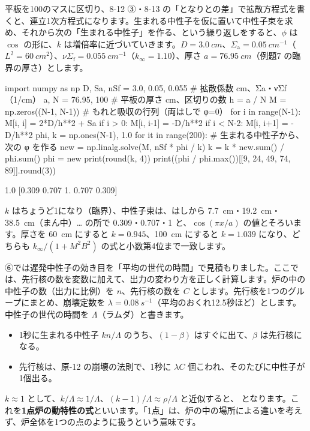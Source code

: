平板を100のマスに区切り、8-12 ③・8-13 の「となりとの差」で拡散方程式を書くと、連立1次方程式になります。生まれる中性子を仮に置いて中性子束を求め、それから次の「生まれる中性子」を作る、という繰り返しをすると、$\phi$ は $\cos$ の形に、$k$ は増倍率に近づいていきます。$D=\qty{3.0}{cm}$、$\Sigma_{\mathrm a}=\qty{0.05}{cm^{-1}}$（$L^2=\qty{60}{cm^2}$）、$\nu\Sigma_{\mathrm f}=\qty{0.055}{cm^{-1}}$（$k_\infty=1.10$）、厚さ $a=\qty{76.95}{cm}$（例題7 の臨界の厚さ）とします。
\begin{phcode}[Python]
import numpy as np
D, Sa, nSf = 3.0, 0.05, 0.055    \# 拡散係数 cm、Σa・νΣf（1/cm）
a, N = 76.95, 100                \# 平板の厚さ cm、区切りの数
h = a / N
M = np.zeros((N-1, N-1))         \# もれと吸収の行列（両はしで φ=0）
for i in range(N-1):
    M[i, i] = 2*D/h**2 + Sa
    if i > 0:   M[i, i-1] = -D/h**2
    if i < N-2: M[i, i+1] = -D/h**2
phi, k = np.ones(N-1), 1.0
for it in range(200):            \# 生まれる中性子から、次の φ を作る
    new = np.linalg.solve(M, nSf * phi / k)
    k = k * new.sum() / phi.sum()
    phi = new
print(round(k, 4))
print((phi / phi.max())[[9, 24, 49, 74, 89]].round(3))
\end{phcode}
\begin{phcodeout}[実行結果]
1.0
[0.309 0.707 1.    0.707 0.309]
\end{phcodeout}
$k$ はちょうど1になり（臨界）、中性子束は、はしから \qty{7.7}{cm}・\qty{19.2}{cm}・\qty{38.5}{cm}（まん中）… の所で 0.309・0.707・1 と、$\cos(\pi x/a)$ の値とそろいます。厚さを \qty{60}{cm} にすると $k=0.945$、\qty{100}{cm} にすると $k=1.039$ になり、どちらも $k_\infty/(1+M^2B^2)$ の式と小数第4位まで一致します。

\label{ph:原-15:sec8}
⑥では遅発中性子の効き目を「平均の世代の時間」で見積もりました。ここでは、先行核の数を変数に加えて、出力の変わり方を正しく計算します。炉の中の中性子の数（出力に比例）を $n$、先行核の数を $C$ とします。先行核を1つのグループにまとめ、崩壊定数を $\lambda=\qty{0.08}{s^{-1}}$（平均のおくれ12.5秒ほど）とします。中性子の世代の時間を $\Lambda$（ラムダ）と書きます。

\begin{itemize}[leftmargin=1.6\zw, itemsep=1pt, topsep=2pt]
\item 1秒に生まれる中性子 $kn/\Lambda$ のうち、$(1-\beta)$ はすぐに出て、$\beta$ は先行核になる。
\item 先行核は、原-12 の崩壊の法則で、1秒に $\lambda C$ 個こわれ、そのたびに中性子が1個出る。
\end{itemize}
$k\approx1$ として、$k/\Lambda\approx1/\Lambda$、$(k-1)/\Lambda\approx\rho/\Lambda$ と近似すると、
\label{ph:原-15:kinetics}となります。これを\textbf{1点炉の動特性の式}といいます。「1点」は、炉の中の場所による違いを考えず、炉全体を1つの点のように扱うという意味です。

